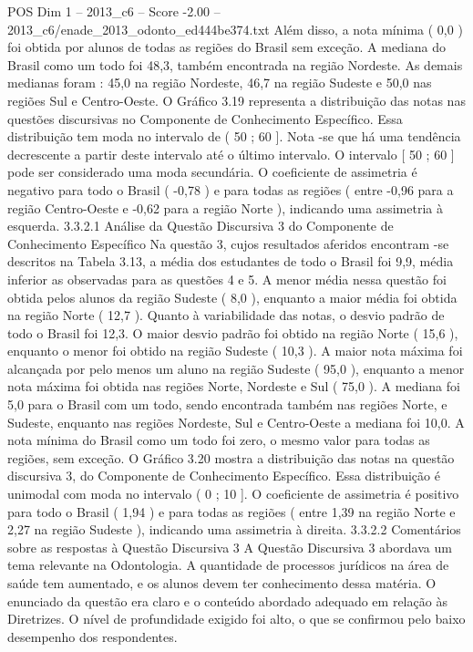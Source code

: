 \begin{textsample}{POS Dim 1 – 2013\_c6 – Score -2.00 – 2013\_c6/enade\_2013\_odonto\_ed444be374.txt}
Além disso, a nota mínima ( 0,0 ) foi obtida por alunos de todas as regiões do Brasil sem exceção.
A mediana do Brasil como um todo foi 48,3, também encontrada na região Nordeste.
As demais medianas foram : 45,0 na região Nordeste, 46,7 na região Sudeste e 50,0 nas regiões Sul e Centro-Oeste.
O Gráfico 3.19 representa a distribuição das notas nas questões discursivas no Componente de Conhecimento Específico.
Essa distribuição tem moda no intervalo de ( 50 ; 60 ].
Nota -se que há uma tendência decrescente a partir deste intervalo até o último intervalo.
O intervalo [ 50 ; 60 ] pode ser considerado uma moda secundária.
O coeficiente de assimetria é negativo para todo o Brasil ( -0,78 ) e para todas as regiões ( entre -0,96 para a região Centro-Oeste e -0,62 para a região Norte ), indicando uma assimetria à esquerda. 3.3.2.1 Análise da Questão Discursiva 3 do Componente de Conhecimento Específico Na questão 3, cujos resultados aferidos encontram -se descritos na Tabela 3.13, a média dos estudantes de todo o Brasil foi 9,9, média inferior as observadas para as questões 4 e 5.
A menor média nessa questão foi obtida pelos alunos da região Sudeste ( 8,0 ), enquanto a maior média foi obtida na região Norte ( 12,7 ).
Quanto à variabilidade das notas, o desvio padrão de todo o Brasil foi 12,3.
O maior desvio padrão foi obtido na região Norte ( 15,6 ), enquanto o menor foi obtido na região Sudeste ( 10,3 ).
A maior nota máxima foi alcançada por pelo menos um aluno na região Sudeste ( 95,0 ), enquanto a menor nota máxima foi obtida nas regiões Norte, Nordeste e Sul ( 75,0 ).
A mediana foi 5,0 para o Brasil com um todo, sendo encontrada também nas regiões Norte, e Sudeste, enquanto nas regiões Nordeste, Sul e Centro-Oeste a mediana foi 10,0.
A nota mínima do Brasil como um todo foi zero, o mesmo valor para todas as regiões, sem exceção.
O Gráfico 3.20 mostra a distribuição das notas na questão discursiva 3, do Componente de Conhecimento Específico.
Essa distribuição é unimodal com moda no intervalo ( 0 ; 10 ].
O coeficiente de assimetria é positivo para todo o Brasil ( 1,94 ) e para todas as regiões ( entre 1,39 na região Norte e 2,27 na região Sudeste ), indicando uma assimetria à direita. 3.3.2.2 Comentários sobre as respostas à Questão Discursiva 3 A Questão Discursiva 3 abordava um tema relevante na Odontologia.
A quantidade de processos jurídicos na área de saúde tem aumentado, e os alunos devem ter conhecimento dessa matéria.
O enunciado da questão era claro e o conteúdo abordado adequado em relação às Diretrizes.
O nível de profundidade exigido foi alto, o que se confirmou pelo baixo desempenho dos respondentes.

\end{textsample}

